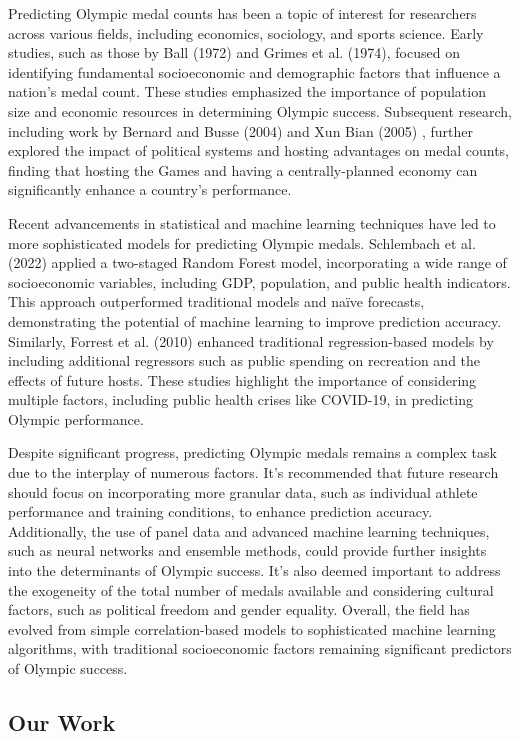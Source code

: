 \documentclass{mcmthesis}
\begin{document}
Predicting Olympic medal counts has been a topic of interest for researchers across various fields, including economics, sociology, and sports science. Early studies, such as those by Ball (1972) and Grimes et al. (1974), \cite{1} focused on identifying fundamental socioeconomic and demographic factors that influence a nation's medal count. These studies emphasized the importance of population size and economic resources in determining Olympic success. Subsequent research, including work by Bernard and Busse (2004) and Xun Bian (2005) \cite{2}, further explored the impact of political systems and hosting advantages on medal counts, finding that hosting the Games and having a centrally-planned economy can significantly enhance a country's performance.

Recent advancements in statistical and machine learning techniques have led to more sophisticated models for predicting Olympic medals. Schlembach et al. (2022) \cite{5} applied a two-staged Random Forest model, incorporating a wide range of socioeconomic variables, including GDP, population, and public health indicators. This approach outperformed traditional models and naïve forecasts, demonstrating the potential of machine learning to improve prediction accuracy. Similarly, Forrest et al. (2010) \cite{4} enhanced traditional regression-based models by including additional regressors such as public spending on recreation and the effects of future hosts. These studies highlight the importance of considering multiple factors, including public health crises like COVID-19, in predicting Olympic performance.

Despite significant progress, predicting Olympic medals remains a complex task due to the interplay of numerous factors. It's recommended that future research should focus on incorporating more granular data, such as individual athlete performance and training conditions, to enhance prediction accuracy. Additionally, the use of panel data and advanced machine learning techniques, such as neural networks and ensemble methods, could provide further insights into the determinants of Olympic success. It's also deemed important to address the exogeneity of the total number of medals available and considering cultural factors, such as political freedom and gender equality. Overall, the field has evolved from simple correlation-based models to sophisticated machine learning algorithms, with traditional socioeconomic factors remaining significant predictors of Olympic success.

\subsection{Our Work}
\end{document}
